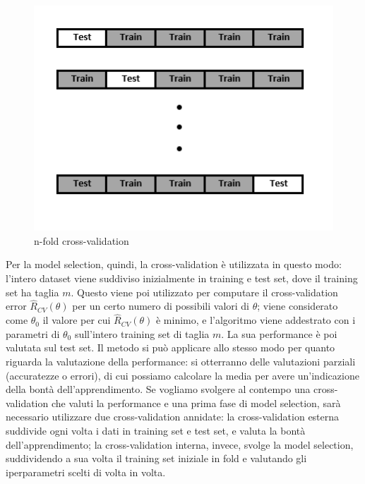 \documentclass[oneside, openany]{book}
\begin{document}
		\begin{figure}
			\begin{center}
				\begin{minipage}{0.47\textwidth}
					\centering
					\includegraphics[width=\textwidth]{CV1.png}
					\caption{n-fold cross-validation}
					\label{fig:crossval}
				\end{minipage}
				
			\end{center}
		\end{figure}
		Per la model selection, quindi, la cross-validation è utilizzata in questo modo: l'intero dataset viene suddiviso inizialmente in training e test set, dove il training set ha taglia $m$. Questo viene poi utilizzato per computare il cross-validation error $\widehat{R}_{CV}(\theta)$ per un certo numero di possibili valori di $\theta$; viene considerato come $\theta_0$ il valore per cui $\widehat{R}_{CV}(\theta)$ è minimo, e l'algoritmo viene addestrato con i parametri di $\theta_0$ sull'intero training set di taglia $m$. La sua performance è poi valutata sul test set.
		Il metodo si può applicare allo stesso modo per quanto riguarda la valutazione della performance: si otterranno delle valutazioni parziali (accuratezze o errori), di cui possiamo calcolare la media per avere un'indicazione della bontà dell'apprendimento. Se vogliamo svolgere al contempo una cross-validation che valuti la performance e una prima fase di model selection, sarà necessario utilizzare due cross-validation annidate: la cross-validation esterna suddivide ogni volta i dati in training set e test set, e valuta la bontà dell'apprendimento; la cross-validation interna, invece, svolge la model selection, suddividendo a sua volta il training set iniziale in fold e valutando gli iperparametri scelti di volta in volta.
		
\end{document}
